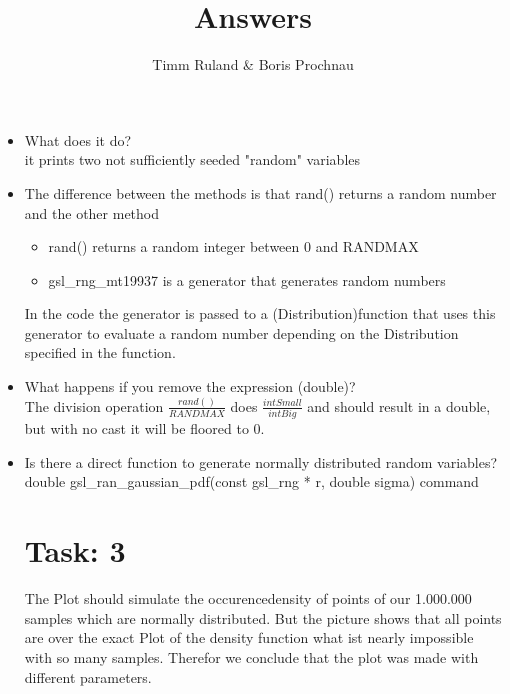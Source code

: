 \documentclass{article}
\title{Answers}
\author{Timm Ruland \& Boris Prochnau}
\begin{document}
\maketitle
\begin{itemize}
\section{Task: 1}	%
	\item What does it do? \\
it prints two not sufficiently seeded "random" variables
	\item The difference between the methods is that rand() returns a random number 
and the other method
  
	\begin{itemize}
		\item rand() returns a random integer between 0 and RANDMAX
		\item gsl\_rng\_mt19937 is a generator that generates random numbers
	\end{itemize}
 In the code the generator is passed to a (Distribution)function that uses this generator 
 to evaluate a random number depending on the Distribution specified in the function.
	\item What happens if you remove the expression (double)?\\
 The division operation $\frac{rand()}{RANDMAX}$ does $\frac{int Small}{int Big}$ and
 should result in a double, but with no cast it will be floored to 0. 
	\item Is there a direct function to generate normally distributed random variables?\\
	double gsl\_ran\_gaussian\_pdf(const gsl\_rng * r, double sigma)
 command

\section{Task: 3} %
The Plot should simulate the occurencedensity of points of our 1.000.000 samples which are normally distributed. But the picture
shows that all points are over the exact Plot of the density function what ist nearly impossible with so many samples. Therefor 
we conclude that the plot was made with different parameters.
\end{itemize}
\end{document}
